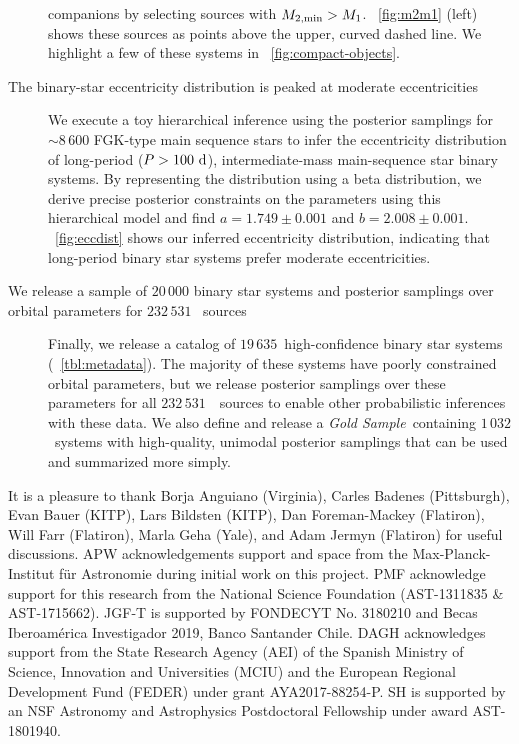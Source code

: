 \documentclass[modern]{aastex63}
\newcommand{\nsources}{\ensuremath{232\,531}}
\newcommand{\nbinary}{\ensuremath{19\,635}}
\newcommand{\goldsample}{\textit{Gold Sample}}
\newcommand{\ngold}{\ensuremath{1\,032}}
\begin{document}
\begin{description}
    companions by selecting sources with $M_{2, {\rm min}} > M_1$.
    \figurename~\ref{fig:m2m1} (left) shows these sources as points above the
    upper, curved dashed line. We highlight a few of these systems in
    \figurename~\ref{fig:compact-objects}.
    \item[The binary-star eccentricity distribution is peaked at
    moderate eccentricities] We execute a toy hierarchical inference using the
    posterior samplings for $\sim 8\,600$ FGK-type main sequence stars to infer
    the eccentricity distribution of long-period ($P>100~\mathrm{d}$),
    intermediate-mass main-sequence star binary systems. By representing the
    distribution using a beta distribution, we derive precise posterior
    constraints on the parameters using this hierarchical model and find $a =
    1.749 \pm 0.001$ and $b = 2.008 \pm 0.001$. \figurename~\ref{fig:eccdist}
    shows our inferred eccentricity distribution, indicating that long-period
    binary star systems prefer moderate eccentricities.
    \item[We release a sample of $20\,000$ binary star systems and posterior
    samplings over orbital parameters for $\nsources$ \apogee\ sources] Finally,
    we release a catalog of \nbinary\ high-confidence binary star systems
    (\tablename~\ref{tbl:metadata}). The majority of these systems have poorly
    constrained orbital parameters, but we release posterior samplings over
    these parameters for all \nsources\ \apogee\ sources to enable other
    probabilistic inferences with these data. We also define and release a
    \goldsample\ containing \ngold\ systems with high-quality, unimodal
    posterior samplings that can be used and summarized more simply.
\end{description}


\acknowledgements

It is a pleasure to thank
Borja Anguiano (Virginia),
Carles Badenes (Pittsburgh),
Evan Bauer (KITP),
Lars Bildsten (KITP),
Dan Foreman-Mackey (Flatiron),
Will Farr (Flatiron),
Marla Geha (Yale),
and Adam Jermyn (Flatiron) for useful discussions.
APW acknowledgements support and space from the Max-Planck-Institut f\"ur
Astronomie during initial work on this project.
PMF acknowledge support for this research from the National Science Foundation
(AST-1311835 \& AST-1715662).
JGF-T is supported by FONDECYT No. 3180210 and Becas Iberoam\'erica Investigador
2019, Banco Santander Chile.
DAGH acknowledges support from the State Research Agency (AEI) of the Spanish
Ministry of Science, Innovation and Universities (MCIU) and the European
Regional Development Fund (FEDER) under grant AYA2017-88254-P.
SH is supported by an NSF Astronomy and Astrophysics Postdoctoral Fellowship
under award AST-1801940.
\end{document}
